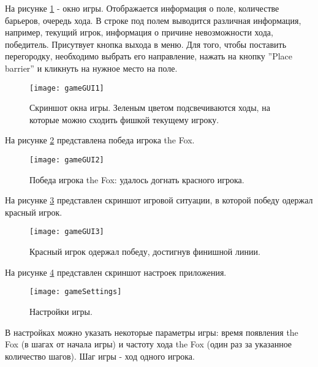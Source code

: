 \documentclass[a4paper]{article}
\begin{document}
На рисунке \ref{pic:gameGUI1} - окно игры. Отображается информация о поле, количестве барьеров, очередь хода. В строке под полем выводится различная информация, например, текущий игрок, информация о причине невозможности хода, победитель. Присутвует кнопка выхода в меню. Для того, чтобы поставить перегородку, необходимо выбрать его направление, нажать на кнопку ''Place barrier'' и кликнуть на нужное место на поле.

\begin{figure}[H]
	\begin{center}
		\texttt{[image: gameGUI1]}
		\caption{Скриншот окна игры. Зеленым цветом подсвечиваются ходы, на которые можно сходить фишкой текущему игроку.} 
		\label{pic:gameGUI1} %
	\end{center}
\end{figure}


На рисунке \ref{pic:gameGUI2} представлена победа игрока the Fox.

\begin{figure}[H]
	\begin{center}
		\texttt{[image: gameGUI2]}
		\caption{Победа игрока the Fox: удалось догнать красного игрока.} 
		\label{pic:gameGUI2} %
	\end{center}
\end{figure}

На рисунке \ref{pic:gameGUI3} представлен скриншот игровой ситуации, в которой победу одержал красный игрок.

\begin{figure}[H]
	\begin{center}
		\texttt{[image: gameGUI3]}
		\caption{Красный игрок одержал победу, достигнув финишной линии.} 
		\label{pic:gameGUI3} %
	\end{center}
\end{figure}

На рисунке \ref{pic:gameSettings} представлен скриншот настроек приложения.
\begin{figure}[H]
	\begin{center}
		\texttt{[image: gameSettings]}
		\caption{Настройки игры.} 
		\label{pic:gameSettings} %
	\end{center}
\end{figure}

В настройках можно указать некоторые параметры игры: время появления the Fox (в шагах от начала игры) и частоту хода the Fox (один раз за указанное количество шагов). Шаг игры - ход одного игрока.
\end{document}
